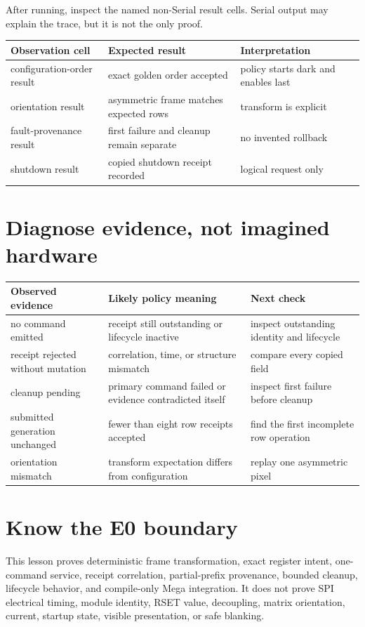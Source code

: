 \documentclass[10pt]{article}
\begin{document}
After running, inspect the named non-Serial result cells. Serial output may
explain the trace, but it is not the only proof.

\begin{tabularx}{\linewidth}{@{}X X X@{}}
\toprule
Observation cell & Expected result & Interpretation\\
\midrule
configuration-order result & exact golden order accepted & policy starts dark and enables last\\
orientation result & asymmetric frame matches expected rows & transform is explicit\\
fault-provenance result & first failure and cleanup remain separate & no invented rollback\\
shutdown result & copied shutdown receipt recorded & logical request only\\
\bottomrule
\end{tabularx}

\section{Diagnose evidence, not imagined hardware}
\begin{tabularx}{\linewidth}{@{}X X X@{}}
\toprule
Observed evidence & Likely policy meaning & Next check\\
\midrule
no command emitted & receipt still outstanding or lifecycle inactive &
inspect outstanding identity and lifecycle\\
receipt rejected without mutation & correlation, time, or structure mismatch &
compare every copied field\\
cleanup pending & primary command failed or evidence contradicted itself &
inspect first failure before cleanup\\
submitted generation unchanged & fewer than eight row receipts accepted &
find the first incomplete row operation\\
orientation mismatch & transform expectation differs from configuration &
replay one asymmetric pixel\\
\bottomrule
\end{tabularx}

\section{Know the E0 boundary}
This lesson proves deterministic frame transformation, exact register intent,
one-command service, receipt correlation, partial-prefix provenance, bounded
cleanup, lifecycle behavior, and compile-only Mega integration. It does not
prove SPI electrical timing, module identity, RSET value, decoupling, matrix
orientation, current, startup state, visible presentation, or safe blanking.
\end{document}
